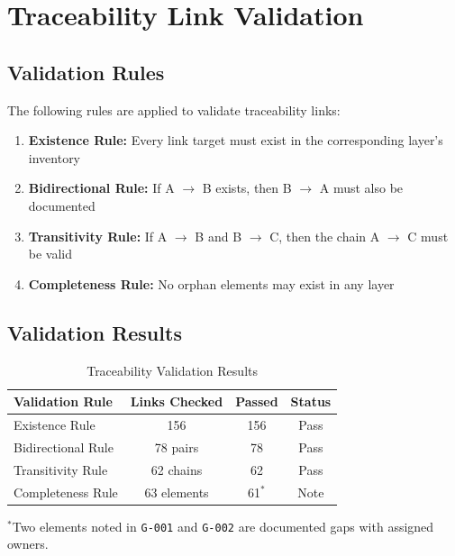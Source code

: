 \documentclass[11pt,a4paper,twoside]{report}
\newcommand{\gapref}[1]{\texttt{#1}}
\begin{document}
\section{Traceability Link Validation}
\label{sec:link-validation}

\subsection{Validation Rules}

The following rules are applied to validate traceability links:

\begin{enumerate}
\item \textbf{Existence Rule:} Every link target must exist in the
corresponding layer's inventory
\item \textbf{Bidirectional Rule:} If A $\rightarrow$ B exists, then
B $\rightarrow$ A must also be documented
\item \textbf{Transitivity Rule:} If A $\rightarrow$ B and B $\rightarrow$ C,
then the chain A $\rightarrow$ C must be valid
\item \textbf{Completeness Rule:} No orphan elements may exist in any layer
\end{enumerate}

\subsection{Validation Results}

\begin{table}[h]
\centering
\caption{Traceability Validation Results}
\label{tab:validation-results}
\begin{tabular}{@{}lccc@{}}
\toprule
\textbf{Validation Rule} & \textbf{Links Checked} & \textbf{Passed} & \textbf{Status} \\
\midrule
Existence Rule & 156 & 156 & \textcolor{sourcegreen}{Pass} \\
Bidirectional Rule & 78 pairs & 78 & \textcolor{sourcegreen}{Pass} \\
Transitivity Rule & 62 chains & 62 & \textcolor{sourcegreen}{Pass} \\
Completeness Rule & 63 elements & 61$^*$ & \textcolor{sapamber}{Note} \\
\bottomrule
\end{tabular}
\end{table}

$^*$Two elements noted in \gapref{G-001} and \gapref{G-002} are documented
gaps with assigned owners.
\end{document}
